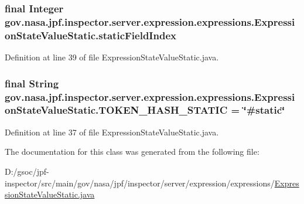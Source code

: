 \subsubsection[{\texorpdfstring{static\+Field\+Index}{staticFieldIndex}}]{\setlength{\rightskip}{0pt plus 5cm}final Integer gov.\+nasa.\+jpf.\+inspector.\+server.\+expression.\+expressions.\+Expression\+State\+Value\+Static.\+static\+Field\+Index\hspace{0.3cm}{\ttfamily [private]}}\hypertarget{classgov_1_1nasa_1_1jpf_1_1inspector_1_1server_1_1expression_1_1expressions_1_1_expression_state_value_static_a0503b428cc99f4f62e2abcc84635dc23}{}\label{classgov_1_1nasa_1_1jpf_1_1inspector_1_1server_1_1expression_1_1expressions_1_1_expression_state_value_static_a0503b428cc99f4f62e2abcc84635dc23}


Definition at line 39 of file Expression\+State\+Value\+Static.\+java.

\subsubsection[{\texorpdfstring{T\+O\+K\+E\+N\+\_\+\+H\+A\+S\+H\+\_\+\+S\+T\+A\+T\+IC}{TOKEN_HASH_STATIC}}]{\setlength{\rightskip}{0pt plus 5cm}final String gov.\+nasa.\+jpf.\+inspector.\+server.\+expression.\+expressions.\+Expression\+State\+Value\+Static.\+T\+O\+K\+E\+N\+\_\+\+H\+A\+S\+H\+\_\+\+S\+T\+A\+T\+IC = \char`\"{}\#static\char`\"{}\hspace{0.3cm}{\ttfamily [static]}}\hypertarget{classgov_1_1nasa_1_1jpf_1_1inspector_1_1server_1_1expression_1_1expressions_1_1_expression_state_value_static_a1add80ae8df94cded1718bf8e7394a7d}{}\label{classgov_1_1nasa_1_1jpf_1_1inspector_1_1server_1_1expression_1_1expressions_1_1_expression_state_value_static_a1add80ae8df94cded1718bf8e7394a7d}


Definition at line 37 of file Expression\+State\+Value\+Static.\+java.



The documentation for this class was generated from the following file\+:\begin{DoxyCompactItemize}
\item 
D\+:/gsoc/jpf-\/inspector/src/main/gov/nasa/jpf/inspector/server/expression/expressions/\hyperlink{_expression_state_value_static_8java}{Expression\+State\+Value\+Static.\+java}\end{DoxyCompactItemize}
